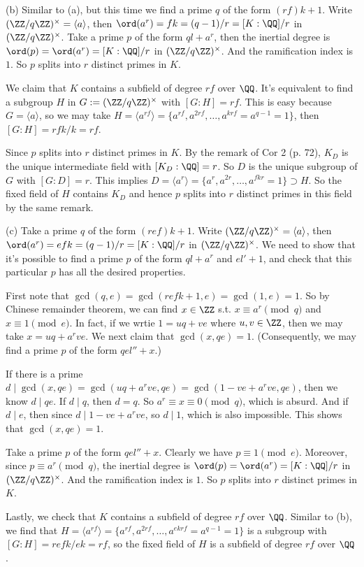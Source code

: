 \documentclass[../Chapter.tex]{subfiles}
\begin{document}
(b) Similar to (a), but this time we find a prime $q$ of the form $(rf)k+1$. Write $(\ZZ/q\ZZ)^\times=\langle a\rangle$, then $\ord(a^r)=fk=(q-1)/r=[K:\QQ]/r$ in $(\ZZ/q\ZZ)^\times$. Take a prime $p$ of the form $ql+a^r$, then the inertial degree is $\ord(p)=\ord(a^r)=[K:\QQ]/r$ in $(\ZZ/q\ZZ)^\times$. And the ramification index is $1$. So $p$ splits into $r$ distinct primes in $K$.

We claim that $K$ contains a subfield of degree $rf$ over $\QQ$. It's equivalent to find a subgroup $H$ in $G:=(\ZZ/q\ZZ)^\times$ with $[G:H]=rf$. This is easy because $G=\langle a\rangle$, so we may take $H=\langle a^{rf}\rangle=\{a^{rf},a^{2rf},\ldots,a^{krf}=a^{q-1}=1\}$, then $[G:H]=rfk/k=rf$.

Since $p$ splits into $r$ distinct primes in $K$. By the remark of Cor 2 (p. 72), $K_D$ is the unique intermediate field with $[K_D:\QQ]=r$. So $D$ is the unique subgroup of $G$ with $[G:D]=r$. This implies $D=\langle a^r\rangle=\{a^r,a^{2r},\ldots,a^{fkr}=1\}\supset H$. So the fixed field of $H$ contains $K_D$ and hence $p$ splits into $r$ distinct primes in this field by the same remark.

(c) Take a prime $q$ of the form $(ref)k+1$. Write $(\ZZ/q\ZZ)^\times=\langle a\rangle$, then $\ord(a^r)=efk=(q-1)/r=[K:\QQ]/r$ in $(\ZZ/q\ZZ)^\times$. We need to show that it's possible to find a prime $p$ of the form $ql+a^r$ and $el'+1$, and check that this particular $p$ has all the desired properties.

First note that $\gcd(q,e)=\gcd(refk+1,e)=\gcd(1,e)=1$. So by Chinese remainder theorem, we can find $x\in\ZZ$ s.t. $x\equiv a^r\pmod{q}$ and $x\equiv 1\pmod{e}$. In fact, if we wrtie $1=uq+ve$ where $u,v\in\ZZ$, then we may take $x=uq+a^rve$. We next claim that $\gcd(x,qe)=1$. (Consequently, we may find a prime $p$ of the form $qel''+x$.)

If there is a prime $d\mid\gcd(x,qe)=\gcd(uq+a^rve,qe)=\gcd(1-ve+a^rve,qe)$, then we know $d\mid qe$. If $d\mid q$, then $d=q$. So $a^r\equiv x\equiv 0 \pmod{q}$, which is absurd. And if $d\mid e$, then since $d\mid 1-ve+a^rve$, so $d\mid 1$, which is also impossible. This shows that $\gcd(x,qe)=1$.

Take a prime $p$ of the form $qel''+x$. Clearly we have $p\equiv 1\pmod{e}$. Moreover, since $p\equiv a^r\pmod{q}$, the inertial degree is $\ord(p)=\ord(a^r)=[K:\QQ]/r$ in $(\ZZ/q\ZZ)^\times$. And the ramification index is $1$. So $p$ splits into $r$ distinct primes in $K$.

Lastly, we check that $K$ contains a subfield of degree $rf$ over $\QQ$. Similar to (b), we find that $H=\langle a^{rf}\rangle=\{a^{rf},a^{2rf},\ldots,a^{ekrf}=a^{q-1}=1\}$ is a subgroup with $[G:H]=refk/ek=rf$, so the fixed field of $H$ is a subfield of degree $rf$ over $\QQ$.
\end{document}

